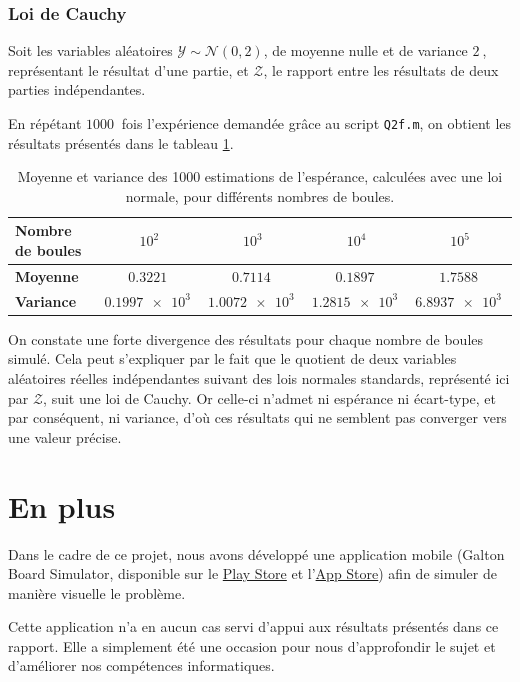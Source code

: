 \documentclass[a4paper, 12pt]{article}
\begin{document}
    \subsubsection*{Loi de Cauchy}
    Soit les variables aléatoires \(\mathcal{Y}\sim\mathcal{N}\left(0, 2\right)\), de moyenne nulle et de variance \(\SI{2}{}\), représentant le résultat d'une partie, et \(\mathcal{Z}\), le rapport entre les résultats de deux parties indépendantes.\par
    En répétant \(\SI{1000}{}\) fois l'expérience demandée grâce au script \texttt{Q2f.m}, on obtient les résultats présentés dans le tableau \ref{table:tab_Q2f}.\par
    \begin{table}[!h]
        \centering
        \begin{tabular}{|l|c|c|c|c|}
            \hline
            \textbf{Nombre de boules} & \(10^2\) & \(10^3\) & \(10^4\) & \(10^5\)\\
            \hline
            \hline
            \textbf{Moyenne} & \(\SI{0.3221}{}\) & \(\SI{0.7114}{}\) & \(\SI{0.1897}{}\) & \(\SI{1.7588}{}\)\\
            \hline
            \textbf{Variance} & \(\SI{0.1997e3}{}\) & \(\SI{1.0072e3}{}\) & \(\SI{1.2815e3}{}\) & \(\SI{6.8937e3}{}\)\\
            \hline
        \end{tabular}
        \caption{Moyenne et variance des 1000 estimations de l'espérance, calculées avec une loi normale, pour différents nombres de boules.}
        \label{table:tab_Q2f}
    \end{table}
    On constate une forte divergence des résultats pour chaque nombre de boules simulé. Cela peut s'expliquer par le fait que le quotient de deux variables aléatoires réelles indépendantes suivant des lois normales standards, représenté ici par \(\mathcal{Z}\), suit une loi de Cauchy. Or celle-ci n'admet ni espérance ni écart-type, et par conséquent, ni variance, d'où ces résultats qui ne semblent pas converger vers une valeur précise.
    \section*{En plus}
	Dans le cadre de ce projet, nous avons développé une application mobile (\og Galton Board Simulator\fg{}, disponible sur le \href{https://play.google.com/store/apps/details?id=com.znkvzr.gbs}{Play Store} et l'\href{https://itunes.apple.com/fr/app/id1350941583?mt=8}{App Store}) afin de simuler de manière visuelle le problème.\par
	Cette application n'a en aucun cas servi d'appui aux résultats présentés dans ce rapport. Elle a simplement été une occasion pour nous d'approfondir le sujet et d'améliorer nos compétences informatiques.
	\appendix
	\restoregeometry
\end{document}
